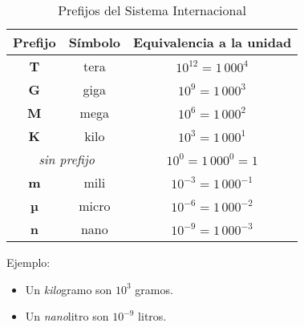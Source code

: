 \documentclass[12pt]{article}
\begin{document}
\begin{table}[h]

    \centering

    \caption{Prefijos del Sistema Internacional}
    \label{tablaPrefijoSI}

    \begin{tabular}{ | c | c | c | }
        \hline
        Prefijo & Símbolo & Equivalencia a la unidad \\
        \hline
        \textbf{T} & tera & $10^{12}=1\,000^{4}$ \\
        \hline
        \textbf{G} & giga & $10^{9}=1\,000^{3}$ \\
        \hline
        \textbf{M} & mega & $10^{6}=1\,000^{2}$ \\
        \hline
        \textbf{K} & kilo & $10^{3}=1\,000^{1}$ \\
        \hline
        \multicolumn{2}{|c|}{\emph{sin prefijo}} & $10^{0}=1\,000^{0}=1$ \\
        \hline
        \textbf{m} & mili & $10^{-3}=1\,000^{-1}$ \\
        \hline
        \textbf{µ} & micro & $10^{-6}=1\,000^{-2}$ \\
        \hline
        \textbf{n} & nano & $10^{-9}=1\,000^{-3}$ \\
        \hline
    \end{tabular}

    \vspace{2\topsep}
    Ejemplo:
    \vspace{-1\topsep}
    \begin{itemize}

        \itemsep2pt \parskip0pt 
        \item   Un \emph{kilo}gramo son $10^{3}$ gramos.
        \item   Un \emph{nano}litro son $10^{-9}$ litros.

    \end{itemize}

\end{table}
\end{document}
